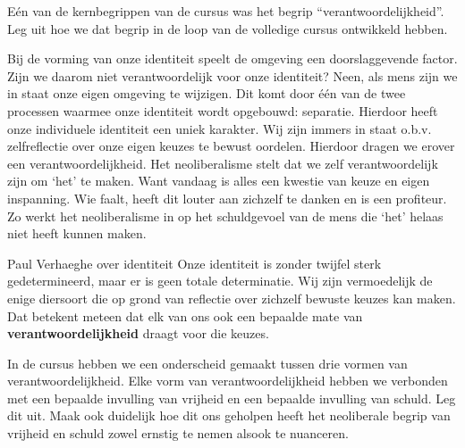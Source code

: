 \documentclass[main.tex]{subfiles}
\begin{document}
\begin{examenvraag}
    \begin{vraag}
        Eén van de kernbegrippen van de cursus was het begrip “verantwoordelijkheid”. Leg uit hoe we dat begrip in de loop van de volledige cursus ontwikkeld hebben.
    \end{vraag}

    \begin{antwoord}
	Bij de vorming van onze identiteit speelt de omgeving een doorslaggevende factor.‭ ‬Zijn we 
	daarom niet verantwoordelijk voor onze identiteit‭? ‬Neen,‭ ‬als mens zijn we in staat onze eigen 
	omgeving te wijzigen.‭ ‬Dit komt door één van de‭ ‬twee processen waarmee onze identiteit wordt 
	opgebouwd:‭ ‬separatie.‭ ‬Hierdoor heeft onze individuele identiteit een uniek karakter.‭ ‬Wij zijn 
	immers in staat o.b.v.‭ ‬zelfreflectie over onze eigen keuzes te bewust oordelen.‭ ‬Hierdoor dragen 
	we erover een verantwoordelijkheid.‭
	‬Het neoliberalisme stelt dat we zelf verantwoordelijk zijn om‭ ‬‘het‭’‬ te maken.‭ ‬Want vandaag is 
	alles een kwestie van keuze en eigen inspanning.‭ ‬Wie faalt,‭ ‬heeft dit louter aan zichzelf te 
	danken en is een profiteur.‭ ‬Zo werkt het neoliberalisme in op het schuldgevoel van de mens die‭ 
	‬‘het‭’‬ helaas niet heeft kunnen maken.
    \end{antwoord}
    \begin{citaat}{Paul Verhaeghe over identiteit}
    Onze
identiteit is zonder twijfel sterk gedetermineerd, maar er is geen totale determinatie. Wij zijn
vermoedelijk de enige diersoort die op grond van reflectie over zichzelf bewuste keuzes kan maken.
Dat betekent meteen dat elk van ons ook een bepaalde mate van \textbf{verantwoordelijkheid} draagt voor die
keuzes. 
    \end{citaat}
\end{examenvraag}


\begin{examenvraag}
    \begin{vraag}
        In de cursus hebben we een onderscheid gemaakt tussen drie vormen van verantwoordelijkheid. Elke vorm van verantwoordelijkheid hebben we verbonden met een bepaalde invulling van vrijheid en een bepaalde invulling van schuld. Leg dit uit. Maak ook duidelijk hoe dit ons geholpen heeft het neoliberale begrip van vrijheid en schuld zowel ernstig te nemen alsook te nuanceren.
    \end{vraag}

    \begin{antwoord}
    \end{antwoord}
\end{examenvraag}
\end{document}
